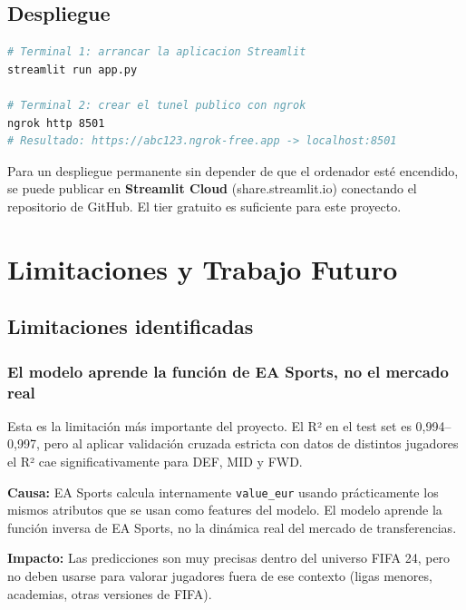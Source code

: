 \documentclass[12pt,a4paper]{report}
\begin{document}
\section{Despliegue}

\begin{lstlisting}[language=bash, caption={Comandos de despliegue local con link público}]
# Terminal 1: arrancar la aplicacion Streamlit
streamlit run app.py

# Terminal 2: crear el tunel publico con ngrok
ngrok http 8501
# Resultado: https://abc123.ngrok-free.app -> localhost:8501
\end{lstlisting}

Para un despliegue permanente sin depender de que el ordenador esté encendido, se puede publicar en \textbf{Streamlit Cloud} (share.streamlit.io) conectando el repositorio de GitHub. El tier gratuito es suficiente para este proyecto.


\chapter{Limitaciones y Trabajo Futuro}

\section{Limitaciones identificadas}

\subsection{El modelo aprende la función de EA Sports, no el mercado real}

Esta es la limitación más importante del proyecto. El R² en el test set es 0{,}994--0{,}997, pero al aplicar validación cruzada estricta con datos de distintos jugadores el R² cae significativamente para DEF, MID y FWD.

\textbf{Causa:} EA Sports calcula internamente \texttt{value\_eur} usando prácticamente los mismos atributos que se usan como features del modelo. El modelo aprende la función inversa de EA Sports, no la dinámica real del mercado de transferencias.

\textbf{Impacto:} Las predicciones son muy precisas dentro del universo FIFA 24, pero no deben usarse para valorar jugadores fuera de ese contexto (ligas menores, academias, otras versiones de FIFA).
\end{document}
